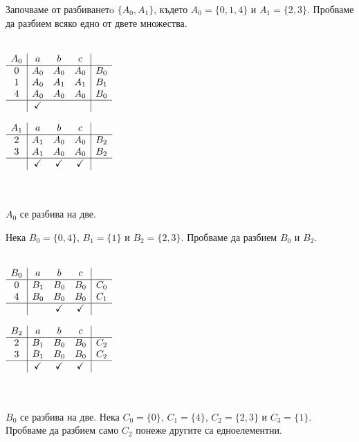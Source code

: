 \documentclass[12pt]{article}
\begin{document}
Започваме от разбиванетo \(\{A_0, A_1\}\), където \(A_0 = \{0, 1, 4\}\) и \(A_1 = \{2, 3\}\).
Пробваме да разбием всяко едно от двете множества.
\\
\vspace*{5mm}
\\
\begin{minipage}{.5\textwidth}
\centering
\(\begin{array}{c|ccc|c}
A_0 & a & b   & c     &     \\ \hline
0   & A_0 & A_0 & A_0 & B_0 \\
1   & A_0 & A_1 & A_1 & B_1 \\
4   & A_0 & A_0 & A_0 & B_0 \\ \hline
    & \checkmark & &  &
\end{array}\)
\end{minipage}
\begin{minipage}{.5\textwidth}
\centering
\(\begin{array}{c|ccc|c}
A_1 & a & b   & c     &     \\ \hline
2   & A_1 & A_0 & A_0 & B_2 \\
3   & A_1 & A_0 & A_0 & B_2 \\ \hline
    & \checkmark & \checkmark & \checkmark &
\end{array}\)
\end{minipage}
\\
\vspace*{5mm}
\\
\(A_0\) се разбива на две.

Нека \(B_0 = \{0, 4\}\), \(B_1 = \{1\}\) и \(B_2 = \{2, 3\}\).
Пробваме да разбием \(B_0\) и \(B_2\).
\\
\vspace*{5mm}
\\
\begin{minipage}{.5\textwidth}
\centering
\(\begin{array}{c|ccc|c}
B_0 & a & b   & c     &     \\ \hline
0   & B_1 & B_0 & B_0 & C_0 \\
4   & B_0 & B_0 & B_0 & C_1 \\ \hline
    &     & \checkmark & \checkmark &
\end{array}\)
\end{minipage}
\begin{minipage}{.5\textwidth}
\centering
\(\begin{array}{c|ccc|c}
B_2 & a & b   & c     &     \\ \hline
2   & B_1 & B_0 & B_0 & C_2 \\
3   & B_1 & B_0 & B_0 & C_2 \\ \hline
    & \checkmark & \checkmark & \checkmark &
\end{array}\)
\end{minipage}
\\
\vspace*{5mm}
\\
\(B_0\) се разбива на две. Нека \(C_0 = \{0\}\), \(C_1 = \{4\}\), \(C_2 = \{2, 3\}\) и \(C_3 = \{1\}\).
Пробваме да разбием само \(C_2\) понеже другите са едноелементни.
\end{document}
